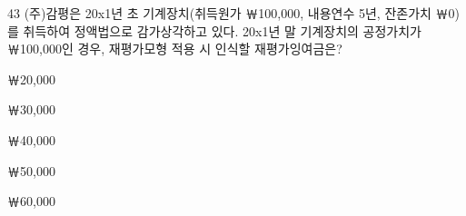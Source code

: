 \begin{question}{43}
(주)감평은 20x1년 초 기계장치(취득원가 ￦100,000, 내용연수 5년, 잔존가치 ￦0)를 취득하여 정액법으로 감가상각하고 있다. 20x1년 말 기계장치의 공정가치가 ￦100,000인 경우, 재평가모형 적용 시 인식할 재평가잉여금은?
\begin{choices}
  \item ￦20,000
  \item ￦30,000
  \item ￦40,000
  \item ￦50,000
  \item ￦60,000
\end{choices}
\end{question}
